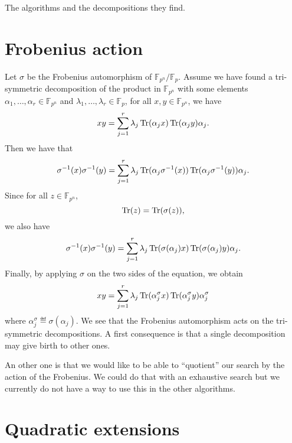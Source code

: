 \documentclass[a4paper,11pt]{article}
\begin{document}
\begin{ex}
\begin{table}
   \caption{The algorithms and the decompositions they find.}
   \label{tab:algos}
 \end{table}

\end{ex}

\section{Frobenius action}

Let $\sigma$ be the Frobenius automorphism of $\mathbb{F}_{p^n}/\mathbb{F}_p$.
Assume we have found a tri-symmetric decomposition of the product in
$\mathbb{F}_{p^n}$ with some elements $\alpha_1, \dots, \alpha_r\in
\mathbb{F}_{p^n}$ and
$\lambda_1, \dots, \lambda_r\in\mathbb{F}_p$, \ie for all
$x, y\in\mathbb{F}_{p^n}$, we have
\[
  xy = \sum_{j=1}^r \lambda_j \operatorname{Tr}(\alpha_jx)\operatorname{Tr}(\alpha_jy)\alpha_j.
\]
Then we have that
\[
  \sigma^{-1}(x)\sigma^{-1}(y) = \sum_{j=1}^r \lambda_j
  \operatorname{Tr}(\alpha_j\sigma^{-1}(x))\operatorname{Tr}(\alpha_j\sigma^{-1}(y))\alpha_j.
\]
Since for all $z\in\mathbb{F}_{p^n}$,
\[
  \operatorname{Tr}(z) = \operatorname{Tr}(\sigma(z)),
\]
we also have
\[
  \sigma^{-1}(x)\sigma^{-1}(y) = \sum_{j=1}^r \lambda_j
  \operatorname{Tr}(\sigma(\alpha_j)x)\operatorname{Tr}(\sigma(\alpha_j)y)\alpha_j.
\]
Finally, by applying $\sigma$ on the two sides of the equation, we obtain
\[
  xy = \sum_{j=1}^r \lambda_j \operatorname{Tr}(\alpha_j^\sigma x)\operatorname{Tr}(\alpha_j^\sigma y)\alpha_j^\sigma
\]
where $\alpha_j^\sigma \eqdef \sigma(\alpha_j)$. We see that the Frobenius
automorphism acts on the tri-symmetric decompositions. A first consequence is
that a single decomposition may give birth to other ones.

An other one is that we would like to be able to ``quotient'' our search by the
action of the Frobenius. We could do that with an exhaustive search but we
currently do not have a way to use this in the other algorithms. 


\section{Quadratic extensions}
\end{document}
